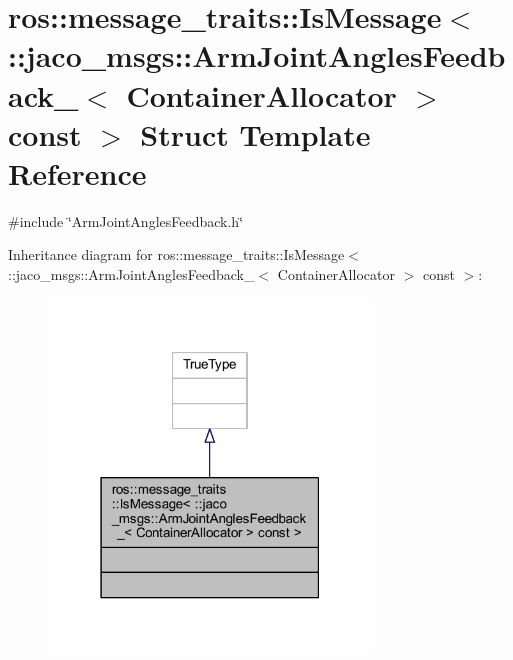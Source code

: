 \hypertarget{structros_1_1message__traits_1_1IsMessage_3_01_1_1jaco__msgs_1_1ArmJointAnglesFeedback___3_01Con0e7d69b5178c34db262ff82755872089}{}\section{ros\+:\+:message\+\_\+traits\+:\+:Is\+Message$<$ \+:\+:jaco\+\_\+msgs\+:\+:Arm\+Joint\+Angles\+Feedback\+\_\+$<$ Container\+Allocator $>$ const $>$ Struct Template Reference}
\label{structros_1_1message__traits_1_1IsMessage_3_01_1_1jaco__msgs_1_1ArmJointAnglesFeedback___3_01Con0e7d69b5178c34db262ff82755872089}


{\ttfamily \#include \char`\"{}Arm\+Joint\+Angles\+Feedback.\+h\char`\"{}}



Inheritance diagram for ros\+:\+:message\+\_\+traits\+:\+:Is\+Message$<$ \+:\+:jaco\+\_\+msgs\+:\+:Arm\+Joint\+Angles\+Feedback\+\_\+$<$ Container\+Allocator $>$ const $>$\+:
\nopagebreak
\begin{figure}[H]
\begin{center}
\leavevmode
\includegraphics[width=243pt]{d5/d5b/structros_1_1message__traits_1_1IsMessage_3_01_1_1jaco__msgs_1_1ArmJointAnglesFeedback___3_01Con437f0c1b5febcc46bd67b025cbff3a13}
\end{center}
\end{figure}


